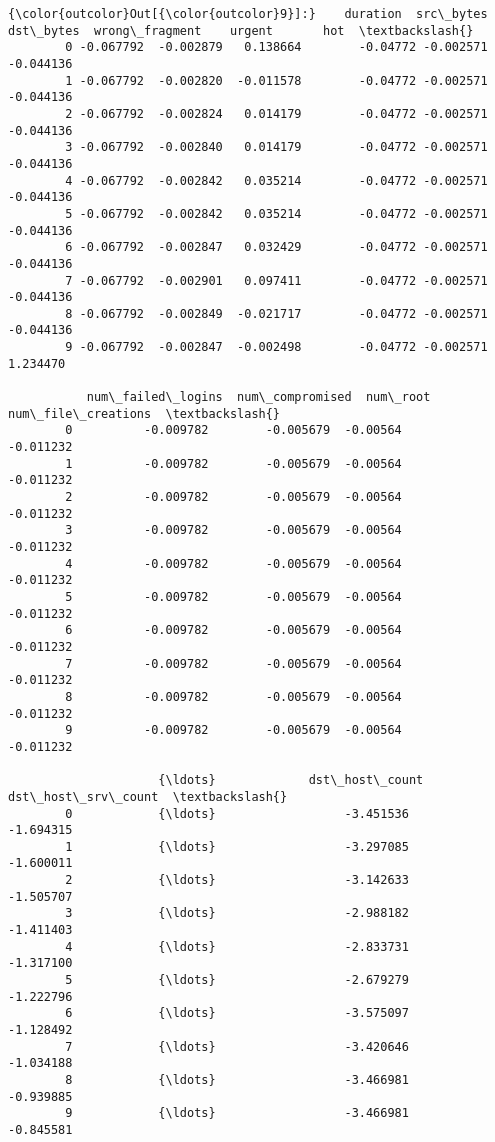 \documentclass[11pt]{article}
\begin{document}
\begin{Verbatim}[commandchars=\\\{\}]
{\color{outcolor}Out[{\color{outcolor}9}]:}    duration  src\_bytes  dst\_bytes  wrong\_fragment    urgent       hot  \textbackslash{}
        0 -0.067792  -0.002879   0.138664        -0.04772 -0.002571 -0.044136   
        1 -0.067792  -0.002820  -0.011578        -0.04772 -0.002571 -0.044136   
        2 -0.067792  -0.002824   0.014179        -0.04772 -0.002571 -0.044136   
        3 -0.067792  -0.002840   0.014179        -0.04772 -0.002571 -0.044136   
        4 -0.067792  -0.002842   0.035214        -0.04772 -0.002571 -0.044136   
        5 -0.067792  -0.002842   0.035214        -0.04772 -0.002571 -0.044136   
        6 -0.067792  -0.002847   0.032429        -0.04772 -0.002571 -0.044136   
        7 -0.067792  -0.002901   0.097411        -0.04772 -0.002571 -0.044136   
        8 -0.067792  -0.002849  -0.021717        -0.04772 -0.002571 -0.044136   
        9 -0.067792  -0.002847  -0.002498        -0.04772 -0.002571  1.234470   
        
           num\_failed\_logins  num\_compromised  num\_root  num\_file\_creations  \textbackslash{}
        0          -0.009782        -0.005679  -0.00564           -0.011232   
        1          -0.009782        -0.005679  -0.00564           -0.011232   
        2          -0.009782        -0.005679  -0.00564           -0.011232   
        3          -0.009782        -0.005679  -0.00564           -0.011232   
        4          -0.009782        -0.005679  -0.00564           -0.011232   
        5          -0.009782        -0.005679  -0.00564           -0.011232   
        6          -0.009782        -0.005679  -0.00564           -0.011232   
        7          -0.009782        -0.005679  -0.00564           -0.011232   
        8          -0.009782        -0.005679  -0.00564           -0.011232   
        9          -0.009782        -0.005679  -0.00564           -0.011232   
        
                     {\ldots}             dst\_host\_count  dst\_host\_srv\_count  \textbackslash{}
        0            {\ldots}                  -3.451536           -1.694315   
        1            {\ldots}                  -3.297085           -1.600011   
        2            {\ldots}                  -3.142633           -1.505707   
        3            {\ldots}                  -2.988182           -1.411403   
        4            {\ldots}                  -2.833731           -1.317100   
        5            {\ldots}                  -2.679279           -1.222796   
        6            {\ldots}                  -3.575097           -1.128492   
        7            {\ldots}                  -3.420646           -1.034188   
        8            {\ldots}                  -3.466981           -0.939885   
        9            {\ldots}                  -3.466981           -0.845581   
        

\end{Verbatim}
\end{document}
